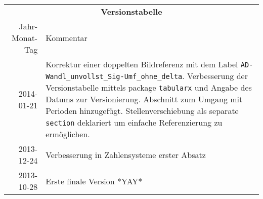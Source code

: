 \begin{table}[htp]
\centering
\begin{tabularx}{\columnwidth}{rp{}}
\multicolumn{2}{c}{\textbf{Versionstabelle}} \\
Jahr-Monat-Tag & Kommentar \\ \hline
2014-01-21 & Korrektur einer doppelten Bildreferenz mit dem Label \texttt{AD-Wandl\_unvollst\_Sig-Umf\_ohne\_delta}.  Verbesserung der Versionstabelle mittels package \texttt{tabularx} und Angabe des Datums zur Versionierung. Abschnitt zum Umgang mit Perioden hinzugefügt. Stellenverschiebung als separate \texttt{section} deklariert um einfache Referenzierung zu ermöglichen. \\
2013-12-24 & Verbesserung in Zahlensysteme erster Absatz \\
2013-10-28 & Erste finale Version *YAY* \\
\end{tabularx}
\end{table}